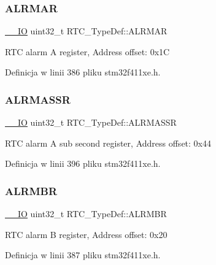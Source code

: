 \subsubsection{\texorpdfstring{A\+L\+R\+M\+AR}{ALRMAR}}
{\footnotesize\ttfamily \hyperlink{core__sc300_8h_aec43007d9998a0a0e01faede4133d6be}{\+\_\+\+\_\+\+IO} uint32\+\_\+t R\+T\+C\+\_\+\+Type\+Def\+::\+A\+L\+R\+M\+AR}

R\+TC alarm A register, Address offset\+: 0x1C 

Definicja w linii 386 pliku stm32f411xe.\+h.

\mbox{\label{struct_r_t_c___type_def_ac5b2e3c0dcdcb569f3fe15dfe3794bc1}} 
\subsubsection{\texorpdfstring{A\+L\+R\+M\+A\+S\+SR}{ALRMASSR}}
{\footnotesize\ttfamily \hyperlink{core__sc300_8h_aec43007d9998a0a0e01faede4133d6be}{\+\_\+\+\_\+\+IO} uint32\+\_\+t R\+T\+C\+\_\+\+Type\+Def\+::\+A\+L\+R\+M\+A\+S\+SR}

R\+TC alarm A sub second register, Address offset\+: 0x44 

Definicja w linii 396 pliku stm32f411xe.\+h.

\mbox{\label{struct_r_t_c___type_def_a9816616e1f00955c8982469d0dd9c953}} 
\subsubsection{\texorpdfstring{A\+L\+R\+M\+BR}{ALRMBR}}
{\footnotesize\ttfamily \hyperlink{core__sc300_8h_aec43007d9998a0a0e01faede4133d6be}{\+\_\+\+\_\+\+IO} uint32\+\_\+t R\+T\+C\+\_\+\+Type\+Def\+::\+A\+L\+R\+M\+BR}

R\+TC alarm B register, Address offset\+: 0x20 

Definicja w linii 387 pliku stm32f411xe.\+h.

\mbox{\label{struct_r_t_c___type_def_a249009cd672e7bcd52df1a41de4619e1}} 
